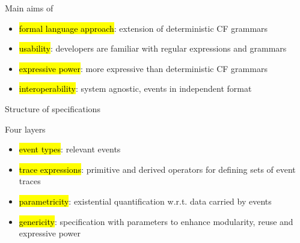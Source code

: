 \documentclass[10pt,usenames,dvipsnames]{beamer}
\begin{document}

\begin{frame}{\rml}

  \begin{block}{Main aims of \rml}
    \begin{itemize}
    \item \hl{formal language approach}: extension of deterministic CF grammars 
    \item \hl{usability}: developers are familiar with regular expressions and grammars
    \item \hl{expressive power}: more expressive than deterministic CF grammars
    \item \hl{interoperability}: system agnostic, events in independent format
    \end{itemize}
  \end{block}
\end{frame}


\begin{frame}{Structure of \rml specifications}
  \begin{block}{Four layers}
    \begin{itemize}
    \item \hl{event types}: relevant events 
    \item \hl{trace expressions}: primitive and derived operators for defining sets of event traces
    \item \hl{parametricity}: existential quantification w.r.t. data carried by events
    \item \hl{genericity}: specification with parameters to enhance modularity, reuse and expressive power
    \end{itemize}
  \end{block}
\end{frame}

\end{document}

